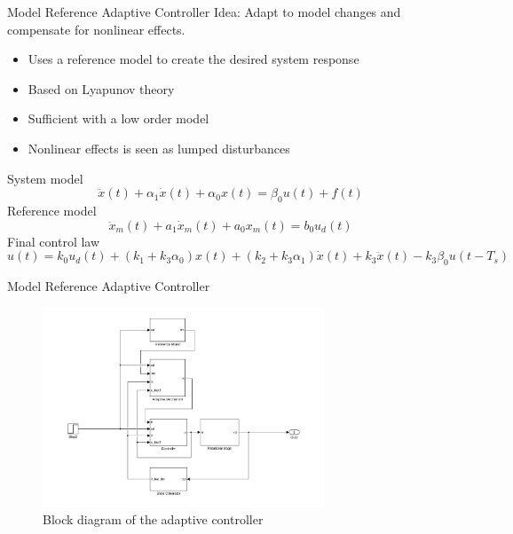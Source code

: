 \documentclass[10pt]{beamer}
\begin{document}
\begin{frame}{Model Reference Adaptive Controller}
  \alert{Idea}: Adapt to model changes and compensate for nonlinear effects.
  \begin{itemize}
    \item Uses a reference model to create the desired system response
    \item Based on Lyapunov theory
    \item Sufficient with a low order model
    \item Nonlinear effects is seen as lumped disturbances
  \end{itemize}
  System model
    \begin{equation*}
      \label{eq:sysmodel}
      \ddot{x}(t) + \alpha_1\dot{x}(t) +  \alpha_0x(t) = \beta_0u(t) + f(t)
    \end{equation*}
  Reference model
    \begin{equation*}
      \label{eq:refmodel}
      \ddot{x}_m(t) + a_1\dot{x}_m(t) +  a_0x_m(t) = b_0u_d(t)
    \end{equation*}
  Final control law
    \begin{equation*}
        \label{eq:adaplawsfinal}
      u(t) = k_0u_d(t) + (k_1 + k_3\alpha_0)x(t) +  (k_2 + k_3\alpha_1)\dot{x}(t) + k_3\ddot{x}(t) - k_3\beta_0u(t-T_s)
    \end{equation*}
\end{frame}

\begin{frame}{Model Reference Adaptive Controller}
  \begin{figure}[h]
    \centering %
    \includegraphics[width=0.75\textwidth, trim=5cm 0cm 3.8cm 0cm, clip=true]{../fig/matlab/adaptive_scheme}
    \caption{\label{fig:adaptive}Block diagram of the adaptive controller}
  \end{figure}
\end{frame}
\end{document}
